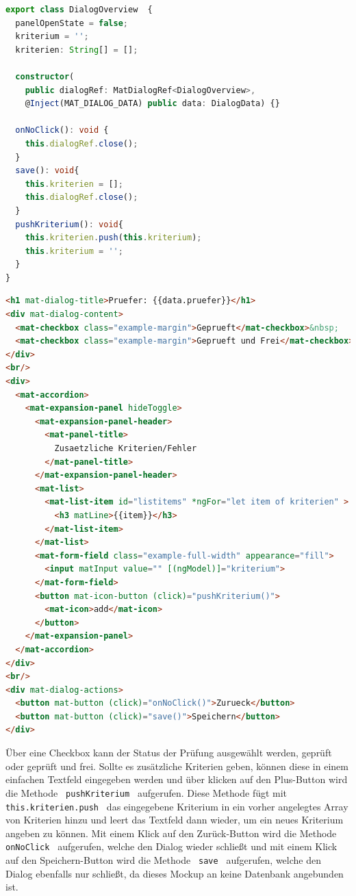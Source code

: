 \begin{lstlisting}[language=Typescript, caption={TypeScript für DialogOverview}]
export class DialogOverview  {
  panelOpenState = false;
  kriterium = '';
  kriterien: String[] = [];

  constructor(
    public dialogRef: MatDialogRef<DialogOverview>,
    @Inject(MAT_DIALOG_DATA) public data: DialogData) {}

  onNoClick(): void {
    this.dialogRef.close();
  }
  save(): void{
    this.kriterien = [];
    this.dialogRef.close();
  }
  pushKriterium(): void{
    this.kriterien.push(this.kriterium);
    this.kriterium = '';
  }
}
\end{lstlisting}

\begin{lstlisting}[language=HTML, caption={HTML-Code für DialogOverview}]
<h1 mat-dialog-title>Pruefer: {{data.pruefer}}</h1>
<div mat-dialog-content>
  <mat-checkbox class="example-margin">Geprueft</mat-checkbox>&nbsp;
  <mat-checkbox class="example-margin">Geprueft und Frei</mat-checkbox>
</div>
<br/>
<div>
  <mat-accordion>
    <mat-expansion-panel hideToggle>
      <mat-expansion-panel-header>
        <mat-panel-title>
          Zusaetzliche Kriterien/Fehler
        </mat-panel-title>
      </mat-expansion-panel-header>
      <mat-list>
        <mat-list-item id="listitems" *ngFor="let item of kriterien" >
          <h3 matLine>{{item}}</h3>
        </mat-list-item>
      </mat-list>
      <mat-form-field class="example-full-width" appearance="fill">
        <input matInput value="" [(ngModel)]="kriterium">
      </mat-form-field>
      <button mat-icon-button (click)="pushKriterium()">
        <mat-icon>add</mat-icon>
      </button>
    </mat-expansion-panel>
  </mat-accordion>
</div>
<br/>
<div mat-dialog-actions>
  <button mat-button (click)="onNoClick()">Zurueck</button>
  <button mat-button (click)="save()">Speichern</button>
</div>
\end{lstlisting}

Über eine Checkbox kann der Status der Prüfung ausgewählt werden, geprüft oder geprüft und frei. Sollte es zusätzliche Kriterien 
geben, können diese in einem einfachen Textfeld eingegeben werden und über klicken auf den Plus-Button wird die Methode \lstinline | pushKriterium |
aufgerufen. Diese Methode fügt mit \lstinline | this.kriterien.push | das eingegebene Kriterium in ein vorher angelegtes Array von Kriterien hinzu
und leert das Textfeld dann wieder, um ein neues Kriterium angeben zu können. Mit einem Klick auf den Zurück-Button wird die Methode
\lstinline | onNoClick | aufgerufen, welche den Dialog wieder schließt und mit einem Klick auf den Speichern-Button wird die Methode \lstinline | save | aufgerufen,
welche den Dialog ebenfalls nur schließt, da dieses Mockup an keine Datenbank angebunden ist.